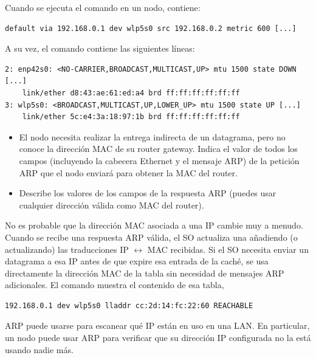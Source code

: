 \begin{exercise}
Cuando se ejecuta el comando  en un nodo, contiene:

\begin{verbatim}
default via 192.168.0.1 dev wlp5s0 src 192.168.0.2 metric 600 [...]
\end{verbatim}

A su vez, el comando  contiene las siguientes líneas:

\begin{verbatim}
2: enp42s0: <NO-CARRIER,BROADCAST,MULTICAST,UP> mtu 1500 state DOWN [...]
    link/ether d8:43:ae:61:ed:a4 brd ff:ff:ff:ff:ff:ff
3: wlp5s0: <BROADCAST,MULTICAST,UP,LOWER_UP> mtu 1500 state UP [...]
    link/ether 5c:e4:3a:18:97:1b brd ff:ff:ff:ff:ff:ff 
\end{verbatim}

\begin{itemize}
\item El nodo necesita realizar la entrega indirecta de un datagrama,
pero no conoce la dirección MAC de su router gateway. Indica el valor de 
todos los campos (incluyendo la cabecera Ethernet y el mensaje ARP) de la petición ARP 
que el nodo enviará para obtener la MAC del router.

\item Describe los valores de los campos de la respuesta ARP (puedes usar cualquier dirección
      válida como MAC del router).
\end{itemize}
\end{exercise}

No es probable que la dirección MAC asociada a una IP cambie muy a menudo.
Cuando se recibe una respuesta ARP válida, el SO actualiza una 
 añadiendo (o actualizando) las traducciones IP $\leftrightarrow$ MAC recibidas.
% 
Si el SO necesita enviar un datagrama a esa IP antes de que expire esa entrada de la caché,
se usa directamente la dirección MAC de la tabla sin necesidad de mensajes ARP adicionales.
% 
El comando  muestra el contenido de esa tabla, \eg\ 
\begin{verbatim}
192.168.0.1 dev wlp5s0 lladdr cc:2d:14:fc:22:60 REACHABLE
\end{verbatim}

\begin{remark}
ARP puede usarse para escanear qué IP están en uso en una LAN.
En particular, un nodo puede usar ARP para verificar que su dirección IP configurada no la está usando nadie más.
\end{remark}

